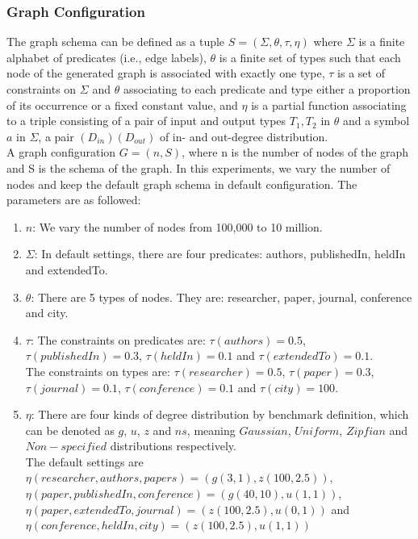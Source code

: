\subsubsection{Graph Configuration}
The graph schema can be defined as a tuple $S = (\Sigma,\theta,\tau,\eta )$ where $\Sigma$ is a finite alphabet of predicates (i.e., edge labels), $\theta$ is a finite set of types such that each node of the generated graph is associated with exactly one type, $\tau $ is a set of constraints on $\Sigma$ and $\theta$ associating to each predicate and type either a proportion of its occurrence or a fixed constant value, and $\eta$ is a partial function associating to a triple consisting of a pair of input and output types $T_1,T_2$ in $\theta$ and a symbol $a$ in $\Sigma$, a pair $(D_{in})(D_{out})$ of in- and out-degree distribution.\\
A graph configuration $G=(n,S)$, where n is the number of nodes of the graph and S is the schema of the graph. In this experiments, we vary the number of nodes and keep the default graph schema in default configuration. The parameters are as followed:
\begin{enumerate}
    \item $n$: We vary the number of nodes from 100,000 to 10 million.
    \item $\Sigma$: In default settings, there are four predicates: authors, publishedIn, heldIn and extendedTo.
    \item $\theta$: There are 5 types of nodes. They are: researcher, paper, journal, conference and city.
    \item $\tau$: The constraints on predicates are: $\tau(authors)=0.5$, $\tau(publishedIn)=0.3$, $\tau(heldIn)=0.1$ and $\tau(extendedTo)=0.1$.\\ The constraints on types are: $\tau(researcher)=0.5$, $\tau(paper)=0.3$, $\tau(journal)=0.1$, $\tau(conference)=0.1 $ and $\tau(city)=100$.
    \item $\eta$: There are four kinds of degree distribution by benchmark definition, which can be denoted as $g$, $u$, $z$ and $ns$, meaning $Gaussian$, $Uniform$, $Zipfian$ and $Non-specified$ distributions respectively.\\ The default settings are $\eta(researcher,authors,papers)=(g(3,1),z(100,2.5))$,\\ $\eta(paper,publishedIn, conference)=(g(40,10),u(1,1))$,\\ $\eta(paper, extendedTo, journal)=(z(100,2.5),u(0,1))$ and \\$\eta(conference, heldIn, city)=(z(100,2.5),u(1,1))$
\end{enumerate}
